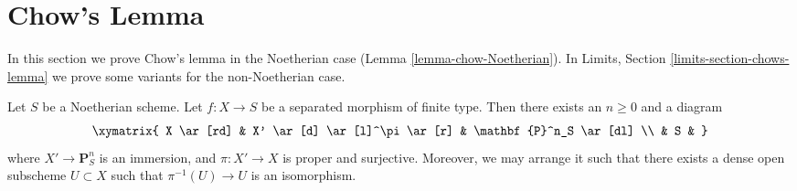 \section{Chow's Lemma}
\label{section-chows-lemma}

\noindent
In this section we prove Chow's lemma in the Noetherian
case (Lemma \ref{lemma-chow-Noetherian}).
In
Limits, Section \ref{limits-section-chows-lemma}
we prove some variants for the non-Noetherian case.

\begin{lemma}
\label{lemma-chow-Noetherian}
\begin{reference}
\cite[II Theorem 5.6.1(a)]{EGA}
\end{reference}
Let $S$ be a Noetherian scheme.
Let $f : X \to S$ be a separated morphism of finite type.
Then there exists an $n \geq 0$ and a diagram
$$
\xymatrix{
X \ar[rd] & X' \ar[d] \ar[l]^\pi \ar[r] & \mathbf{P}^n_S \ar[dl] \\
& S &
}
$$
where $X' \to \mathbf{P}^n_S$ is an immersion, and
$\pi : X' \to X$ is proper and surjective. Moreover, we may
arrange it such that there exists a dense open subscheme
$U \subset X$ such that $\pi^{-1}(U) \to U$ is an isomorphism.
\end{lemma}

